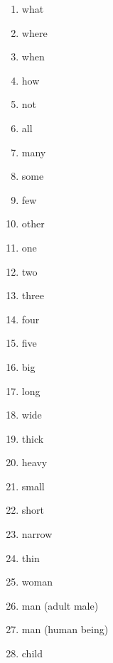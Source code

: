\documentclass[a5,landscape]{article}
\begin{document}
{\begin{multicols}{4}
\begin{enumerate}
\item   what 

\item   where 

\item   when 

\item   how 

\item   not 

\item   all 

\item   many 

\item   some 

\item   few 

\item   other 

\item   one 

\item   two 

\item   three 

\item   four 

\item   five 

\item   big 

\item   long 

\item   wide 

\item   thick 

\item   heavy 

\item   small 

\item   short 

\item   narrow 

\item   thin 

\item   woman 

\item   man (adult male) 

\item   man (human being) 

\item   child 


\end{enumerate}
\end{multicols}}
\end{document}
